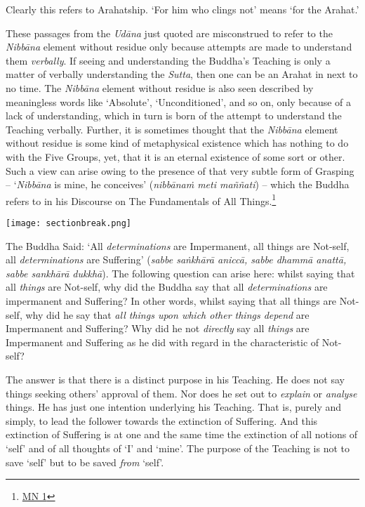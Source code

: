 Clearly this refers to Arahatship. `For him who clings not' means `for the Arahat.'

These passages from the \textit{Udāna} just quoted are misconstrued to refer to the \textit{Nibbāna} element without residue only because attempts are made to understand them \emph{verbally}. If seeing and understanding the Buddha's Teaching is only a matter of verbally understanding the \textit{Sutta}, then one can be an Arahat in next to no time. The \textit{Nibbāna} element without residue is also seen described by meaningless words like `Absolute', `Unconditioned', and so on, only because of a lack of understanding, which in turn is born of the attempt to understand the Teaching verbally. Further, it is sometimes thought that the \textit{Nibbāna} element without residue is some kind of metaphysical existence which has nothing to do with the Five Groups, yet, that it is an eternal existence of some sort or other. Such a view can arise owing to the presence of that very subtle form of Grasping -- `\textit{Nibbāna} is mine, he conceives' (\textit{nibbānaṁ meti maññati}) -- which the Buddha refers to in his Discourse on The Fundamentals of All Things.\footnote{\href{https://suttacentral.net/mn1/en/bodhi}{MN 1}}

\texttt{[image: sectionbreak.png]}

The Buddha Said: `All \textit{determinations} are Impermanent, all things are Not-self, all \textit{determinations} are Suffering' (\textit{sabbe saṅkhārā aniccā, sabbe dhammā anattā, sabbe sankhārā dukkhā}). The following question can arise here: whilst saying that all \emph{things} are Not-self, why did the Buddha say that all \textit{determinations} are impermanent and Suffering? In other words, whilst saying that all things are Not-self, why did he say that \emph{all things upon which other things depend} are Impermanent and Suffering? Why did he not \emph{directly} say all \emph{things} are Impermanent and Suffering as he did with regard in the characteristic of Not-self?

The answer is that there is a distinct purpose in his Teaching. He does not say things seeking others' approval of them. Nor does he set out to \emph{explain} or \emph{analyse} things. He has just one intention underlying his Teaching. That is, purely and simply, to lead the follower towards the extinction of Suffering. And this extinction of Suffering is at one and the same time the extinction of all notions of `self' and of all thoughts of `I' and `mine'. The purpose of the Teaching is not to save `self' but to be saved \emph{from} `self'.

